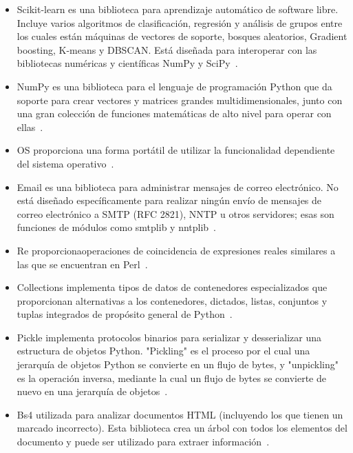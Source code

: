 \documentclass[conference,a4paper]{IEEEtran}
\begin{document}
\begin{itemize}
\item Scikit-learn es una biblioteca para aprendizaje automático de software libre. Incluye varios algoritmos de clasificación, regresión y análisis de grupos entre los cuales están máquinas de vectores de soporte, bosques aleatorios, Gradient boosting, K-means y DBSCAN. Está diseñada para interoperar con las bibliotecas numéricas y científicas NumPy y SciPy~\cite{b12}.

\item  NumPy es una biblioteca para el lenguaje de programación Python que da soporte para crear vectores y matrices grandes multidimensionales, junto con una gran colección de funciones matemáticas de alto nivel para operar con ellas~\cite{b13}.

\item OS proporciona una forma portátil de utilizar la funcionalidad dependiente del sistema operativo~\cite{b14}.

\item Email es una biblioteca para administrar mensajes de correo electrónico. No está diseñado específicamente para realizar ningún envío de mensajes de correo electrónico a SMTP (RFC 2821), NNTP u otros servidores; esas son funciones de módulos como smtplib y nntplib~\cite{b15}.

\item Re proporcionaoperaciones de coincidencia de expresiones reales similares a las que se encuentran en Perl~\cite{b16}.

\item Collections  implementa tipos de datos de contenedores especializados que proporcionan alternativas a los contenedores, dictados, listas, conjuntos y tuplas integrados de propósito general de Python~\cite{b17}.

\item Pickle implementa protocolos binarios para serializar y desserializar una estructura de objetos Python. "Pickling" es el proceso por el cual una jerarquía de objetos Python se convierte en un flujo de bytes, y "unpickling" es la operación inversa, mediante la cual un flujo de bytes se convierte de nuevo en una jerarquía de objetos~\cite{b18}.

\item Bs4 utilizada para analizar documentos HTML (incluyendo los que tienen un marcado incorrecto). Esta biblioteca crea un árbol con todos los elementos del documento y puede ser utilizado para extraer información~\cite{b19}.




\end{itemize}
\end{document}

